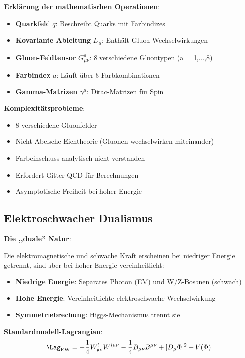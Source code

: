	\textbf{Erklärung der mathematischen Operationen}:
	\begin{itemize}
		\item \textbf{Quarkfeld} $q$: Beschreibt Quarks mit Farbindizes
		\item \textbf{Kovariante Ableitung} $D_\mu$: Enthält Gluon-Wechselwirkungen
		\item \textbf{Gluon-Feldtensor} $G_{\mu\nu}^a$: 8 verschiedene Gluontypen (a = 1,...,8)
		\item \textbf{Farbindex} $a$: Läuft über 8 Farbkombinationen
		\item \textbf{Gamma-Matrizen} $\gamma^\mu$: Dirac-Matrizen für Spin
	\end{itemize}
	
	\textbf{Komplexitätsprobleme}:
	\begin{itemize}
		\item 8 verschiedene Gluonfelder
		\item Nicht-Abelsche Eichtheorie (Gluonen wechselwirken miteinander)
		\item Farbeinschluss analytisch nicht verstanden
		\item Erfordert Gitter-QCD für Berechnungen
		\item Asymptotische Freiheit bei hoher Energie
	\end{itemize}
	
	\subsection{Elektroschwacher Dualismus}
	
	\textbf{Die ,,duale'' Natur}:
	
	Die elektromagnetische und schwache Kraft erscheinen bei niedriger Energie getrennt, sind aber bei hoher Energie vereinheitlicht:
	
	\begin{itemize}
		\item \textbf{Niedrige Energie}: Separates Photon (EM) und W/Z-Bosonen (schwach)
		\item \textbf{Hohe Energie}: Vereinheitlichte elektroschwache Wechselwirkung
		\item \textbf{Symmetriebrechung}: Higgs-Mechanismus trennt sie
	\end{itemize}
	
	\textbf{Standardmodell-Lagrangian}:
	\begin{equation}
		\Lag_{\text{EW}} = -\frac{1}{4} W_{\mu\nu}^i W^{i\mu\nu} - \frac{1}{4} B_{\mu\nu} B^{\mu\nu} + |D_\mu \Phi|^2 - V(\Phi)
	\end{equation}
	
